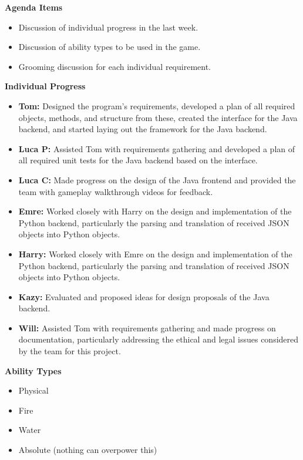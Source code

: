 \documentclass[11pt]{article}
\begin{document}
    \textbf{Agenda Items}
    \begin{itemize}
        \item Discussion of individual progress in the last week.
        \item Discussion of ability types to be used in the game.
        \item Grooming discussion for each individual requirement.
    \end{itemize}

    \textbf{Individual Progress}
    \begin{itemize}
        \item \textbf{Tom:} Designed the program's requirements, developed a plan of all required objects, methods, and structure from these, created the interface for the Java backend, and started laying out the framework for the Java backend.

        \item \textbf{Luca P:} Assisted Tom with requirements gathering and developed a plan of all required unit tests for the Java backend based on the interface.

        \item \textbf{Luca C:} Made progress on the design of the Java frontend and provided the team with gameplay walkthrough videos for feedback.

        \item \textbf{Emre:} Worked closely with Harry on the design and implementation of the Python backend, particularly the parsing and translation of received JSON objects into Python objects.

        \item \textbf{Harry:} Worked closely with Emre on the design and implementation of the Python backend, particularly the parsing and translation of received JSON objects into Python objects.

        \item \textbf{Kazy:} Evaluated and proposed ideas for design proposals of the Java backend.

        \item \textbf{Will:} Assisted Tom with requirements gathering and made progress on documentation, particularly addressing the ethical and legal issues considered by the team for this project.
    \end{itemize}


    \textbf{Ability Types}
    \begin{itemize}
        \item Physical
        \item Fire
        \item Water
        \item Absolute (nothing can overpower this)
    \end{itemize}
\end{document}
